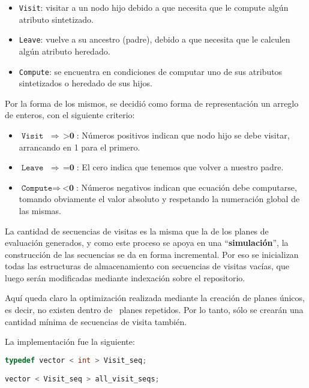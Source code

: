 \begin{itemize}
\item \texttt{Visit}: visitar a un nodo hijo debido a que necesita que le compute algún atributo sintetizado.
\item \texttt{Leave}: vuelve a su ancestro (padre), debido a que necesita que le calculen algún atributo heredado.
\item \texttt{Compute}: se encuentra en condiciones de computar uno de sus atributos sintetizados o heredado de sus hijos.
\end{itemize}

Por la forma de los mismos, se decidió como forma de representación un arreglo de enteros, con el siguiente criterio:

\begin{itemize}
\item $\texttt{Visit}\ \ \ \  \Rightarrow \ \ \textbf{>0}$: Números positivos indican que nodo hijo se debe visitar, arrancando en 1 para el primero.
\item $\texttt{Leave}\ \ \ \  \Rightarrow \ \ \textbf{=0}$: El cero indica que tenemos que volver a nuestro padre.
\item $\texttt{Compute} \Rightarrow \ \textbf{<0}$: Números negativos indican que ecuación debe computarse, tomando obviamente el valor absoluto y respetando la numeración global de las mismas.
\end{itemize}

La cantidad de secuencias de visitas es la misma que la de los planes de evaluación generados, y como este proceso se apoya en una ``\textbf{simulación}'', la construcción de las secuencias se da en forma incremental. Por eso se inicializan todas las estructuras de almacenamiento con secuencias de visitas vacías, que luego serán modificadas mediante indexación sobre el repositorio.

Aquí queda claro la optimización realizada mediante la creación de planes únicos, es decir, no existen dentro de \maggen\ planes repetidos. Por lo tanto, sólo se crearán una cantidad mínima de secuencias de visita también. 


La implementación fue la siguiente:

\begin{lstlisting}[language=C++, basicstyle=\scriptsize, columns=fullflexible, linewidth=7cm]
typedef vector < int > Visit_seq;

vector < Visit_seq > all_visit_seqs;
\end{lstlisting}

